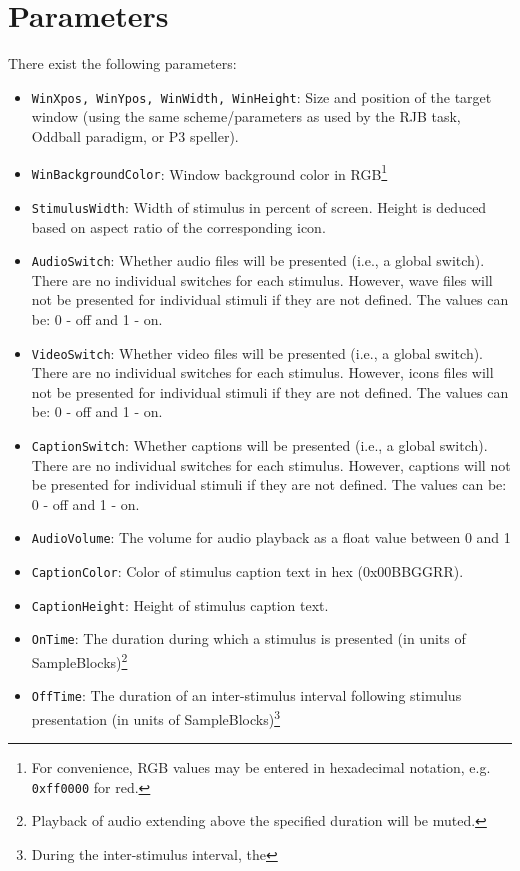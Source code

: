\documentclass[letterpaper,oneside,12pt]{article}
\begin{document}
\section{Parameters}
There exist the following parameters:
\begin{itemize}
 \item {\tt WinXpos, WinYpos, WinWidth, WinHeight}: Size and position of the target window (using the same scheme/parameters 
       as used by the RJB task, Oddball paradigm, or P3 speller).
 \item {\tt WinBackgroundColor}: Window background color in RGB\footnote{For convenience, RGB values
       may be entered in hexadecimal notation, e.g. \texttt{0xff0000} for red.}
 \item {\tt StimulusWidth}: Width of stimulus in percent of screen. Height is deduced based on aspect ratio of the corresponding icon.
 \item {\tt AudioSwitch}: Whether audio files will be presented
       (i.e., a global switch). There are no individual switches for each stimulus. However,
       wave files will not be presented for individual stimuli if they are not defined. The values can be: 0 - off and 1 - on.
 \item {\tt VideoSwitch}: Whether video files will be presented
       (i.e., a global switch). There are no individual switches for each stimulus. However,
       icons files will not be presented for individual stimuli if they are not defined. The values can be: 0 - off and 1 - on.
 \item {\tt CaptionSwitch}: Whether captions will be presented
       (i.e., a global switch). There are no individual switches for each stimulus. However,
       captions will not be presented for individual stimuli if they are not defined. The values can be: 0 - off and 1 - on.
 \item {\tt AudioVolume}: The volume for audio playback as a float value between 0 and 1
 \item {\tt CaptionColor}: Color of stimulus caption text in hex (0x00BBGGRR).
 \item {\tt CaptionHeight}: Height of stimulus caption text.
 \item {\tt OnTime}: The duration during which a stimulus is presented (in units of
       SampleBlocks)\footnote{Playback of audio extending above the specified duration 
       will be muted.}
 \item {\tt OffTime}: The duration of an inter-stimulus interval following stimulus presentation
       (in units of SampleBlocks)\footnote{During the inter-stimulus interval, the
}
\end{itemize}
\end{document}
